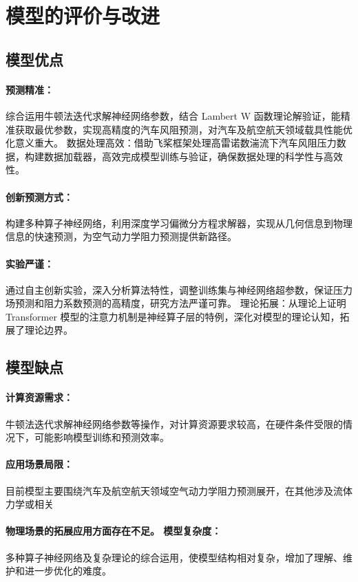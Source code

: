 \documentclass{MMCStyle}
\begin{document}
\section{模型的评价与改进}

\subsection{模型优点}
\paragraph{预测精准：}
综合运用牛顿法迭代求解神经网络参数，结合 Lambert W 函数理论解验证，能精准获取最优参数，实现高精度的汽车风阻预测，对汽车及航空航天领域载具性能优化意义重大。
数据处理高效：借助飞桨框架处理高雷诺数湍流下汽车风阻压力数据，构建数据加载器，高效完成模型训练与验证，确保数据处理的科学性与高效性。
\paragraph{创新预测方式：}
构建多种算子神经网络，利用深度学习偏微分方程求解器，实现从几何信息到物理信息的快速预测，为空气动力学阻力预测提供新路径。
\paragraph{实验严谨：}
通过自主创新实验，深入分析算法特性，调整训练集与神经网络超参数，保证压力场预测和阻力系数预测的高精度，研究方法严谨可靠。
理论拓展：从理论上证明 Transformer 模型的注意力机制是神经算子层的特例，深化对模型的理论认知，拓展了理论边界。
\subsection{模型缺点}
\paragraph{计算资源需求：}
牛顿法迭代求解神经网络参数等操作，对计算资源要求较高，在硬件条件受限的情况下，可能影响模型训练和预测效率。
\paragraph{应用场景局限：}
目前模型主要围绕汽车及航空航天领域空气动力学阻力预测展开，在其他涉及流体力学或相关
\paragraph{物理场景的拓展应用方面存在不足。
模型复杂度：}
多种算子神经网络及复杂理论的综合运用，使模型结构相对复杂，增加了理解、维护和进一步优化的难度。
\end{document}
